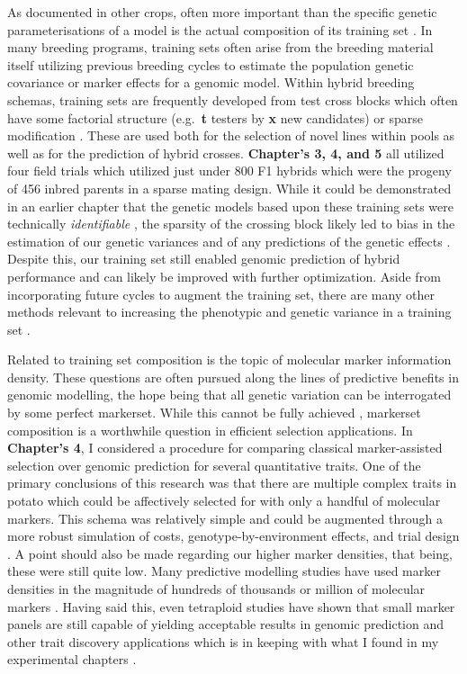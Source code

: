 \documentclass[
]{article}
\begin{document}
As documented in other crops, often more important than the specific
genetic parameterisations of a model is the actual composition of its
training set \autocite{Dias2019}. In many breeding programs, training
sets often arise from the breeding material itself utilizing previous
breeding cycles to estimate the population genetic covariance or marker
effects for a genomic model. Within hybrid breeding schemas, training
sets are frequently developed from test cross blocks which often have
some factorial structure (e.g.~\textbf{t} testers by \textbf{x} new
candidates) or sparse modification \autocite{Jarquin2020}. These are
used both for the selection of novel lines within pools as well as for
the prediction of hybrid crosses. \textbf{Chapter's 3, 4, and 5} all
utilized four field trials which utilized just under 800 F1 hybrids
which were the progeny of 456 inbred parents in a sparse mating design.
While it could be demonstrated in an earlier chapter that the genetic
models based upon these training sets were technically
\emph{identifiable} \autocite{Xenakis2019}, the sparsity of the crossing
block likely led to bias in the estimation of our genetic variances and
of any predictions of the genetic effects \autocite{Mohring2011}.
Despite this, our training set still enabled genomic prediction of
hybrid performance and can likely be improved with further optimization.
Aside from incorporating future cycles to augment the training set,
there are many other methods relevant to increasing the phenotypic and
genetic variance in a training set
\autocite{Isidro2015,Berro2019,Ou2019}.

Related to training set composition is the topic of molecular marker
information density. These questions are often pursued along the lines
of predictive benefits in genomic modelling, the hope being that all
genetic variation can be interrogated by some perfect markerset. While
this cannot be fully achieved \autocite{Brachi2011}, markerset
composition is a worthwhile question in efficient selection
applications. In \textbf{Chapter's 4}, I considered a procedure for
comparing classical marker-assisted selection over genomic prediction
for several quantitative traits. One of the primary conclusions of this
research was that there are multiple complex traits in potato which
could be affectively selected for with only a handful of molecular
markers. This schema was relatively simple and could be augmented
through a more robust simulation of costs, genotype-by-environment
effects, and trial design \autocite{Peixoto2024}. A point should also be
made regarding our higher marker densities, that being, these were still
quite low. Many predictive modelling studies have used marker densities
in the magnitude of hundreds of thousands or million of molecular
markers \autocite{Druet2014,Weber2024}. Having said this, even
tetraploid studies have shown that small marker panels are still capable
of yielding acceptable results in genomic prediction and other trait
discovery applications which is in keeping with what I found in my
experimental chapters \autocite{Aalborg2024,Leyva-Perez2022}.
\end{document}
